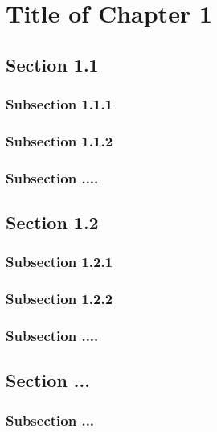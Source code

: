\documentclass[13pt,a4paper]{extreport}
\begin{document}
\justifying
{}
\chapter{Title of Chapter 1}

\justifying
\section{Section 1.1}

\justifying
\subsection{Subsection 1.1.1}

\justifying
\subsection{Subsection 1.1.2}

\justifying
\subsection{Subsection ....}

\justifying
\section{Section 1.2}

\justifying
\subsection{Subsection 1.2.1}

\justifying
\subsection{Subsection 1.2.2}

\justifying
\subsection{Subsection ....}

\justifying
\section{Section ...}

\justifying
\subsection{Subsection ...}
\end{document}
